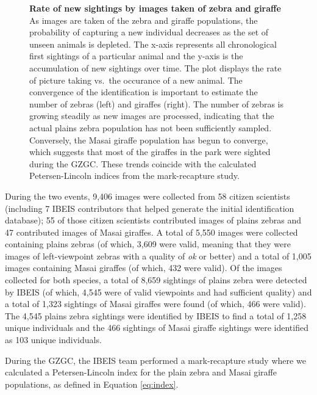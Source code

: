 \begin{figure}[!htb]%
	\centering
    	\caption[Rate of New Sightings by Images Taken of Zebra and Giraffe]{\textbf{Rate of new sightings by images taken of zebra and giraffe}  As images are taken of the zebra and giraffe populations, the probability of capturing a new individual decreases as the set of unseen animals is depleted.  The x-axis represents all chronological first sightings of a particular animal and the y-axis is the accumulation of new sightings over time.  The plot displays the rate of picture taking vs.\ the occurance of a new animal.  The convergence of the identification is important to estimate the number of zebras (left) and giraffes (right).   The number of zebras is growing steadily as new images are processed, indicating that the actual plains zebra population has not been sufficiently sampled.  Conversely, the Masai giraffe population has begun to converge, which suggests that most of the giraffes in the park were sighted during the GZGC.  These trends coincide with the calculated Petersen-Lincoln indices from the mark-recapture study.}
    	\label{fig:convergence}
\end{figure}

During the two events, 9,406 images were collected from 58 citizen scientists (including 7 IBEIS contributors that helped generate the initial identification database); 55 of those citizen scientists contributed images of plains zebras and 47 contributed images of Masai giraffes.  A total of 5,550 images were collected containing plains zebras (of which, 3,609 were valid, meaning that they were images of left-viewpoint zebras with a quality of \textit{ok} or better) and a total of 1,005 images containing Masai giraffes (of which, 432 were valid).  Of the images collected for both species, a total of 8,659 sightings of plains zebra were detected by IBEIS (of which, 4,545 were of valid viewpoints and had sufficient quality) and a total of 1,323 sightings of Masai giraffes were found (of which, 466 were valid).  The 4,545 plains zebra sightings were identified by IBEIS to find a total of 1,258 unique individuals and the 466 sightings of Masai giraffe sightings were identified as 103 unique individuals.

During the GZGC, the IBEIS team performed a mark-recapture study \cite{petersen_yearly_1896, robson_sample_1964, seber_estimation_1982, pradel_utilization_1996, krebs_ecological_1999} where we calculated a Petersen-Lincoln index \cite{pacala_population_1985} for the plain zebra and Masai giraffe populations, as defined in Equation \ref{eq:index}.

